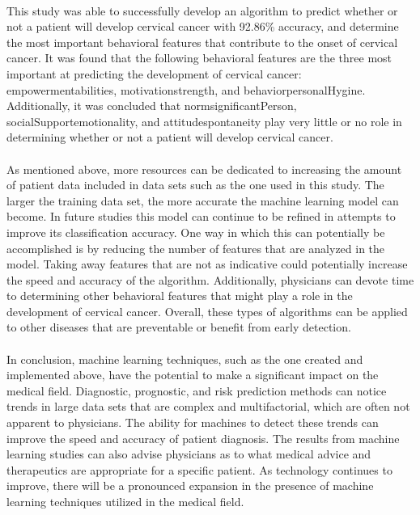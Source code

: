 \documentclass[10pt, oneside, twocolumn]{article}
\begin{document}
\paragraph{} 
This study was able to successfully develop an algorithm to predict whether or not a patient will develop cervical cancer with 92.86\% accuracy, and determine the most important behavioral features that contribute to the onset of cervical cancer. It was found that the following behavioral features are the three most important at predicting the development of cervical cancer: empowerment\textunderscore abilities, motivation\textunderscore strength, and behavior\textunderscore personalHygine. Additionally, it was concluded that norm\textunderscore significantPerson, socialSupport\textunderscore emotionality, and attitude\textunderscore spontaneity play very little or no role in determining whether or not a patient will develop cervical cancer. 
\paragraph{} 
As mentioned above, more resources can be dedicated to increasing the amount of patient data included in data sets such as the one used in this study. The larger the training data set, the more accurate the machine learning model can become. In future studies this model can continue to be refined in attempts to improve its classification accuracy. One way in which this can potentially be accomplished is by reducing the number of features that are analyzed in the model. Taking away features that are not as indicative could potentially increase the speed and accuracy of the algorithm. Additionally, physicians can devote time to determining other behavioral features that might play a role in the development of cervical cancer. Overall, these types of algorithms can be applied to other diseases that are preventable or benefit from early detection. 
\paragraph{} 
In conclusion, machine learning techniques, such as the one created and implemented above, have the potential to make a significant impact on the medical field. Diagnostic, prognostic, and risk prediction methods can notice trends in large data sets that are complex and multifactorial, which are often not apparent to physicians. The ability for machines to detect these trends can improve the speed and accuracy of patient diagnosis. The results from machine learning studies can also advise physicians as to what medical advice and therapeutics are appropriate for a specific patient. As technology continues to improve, there will be a pronounced expansion in the presence of machine learning techniques utilized in the medical field.
\end{document}
